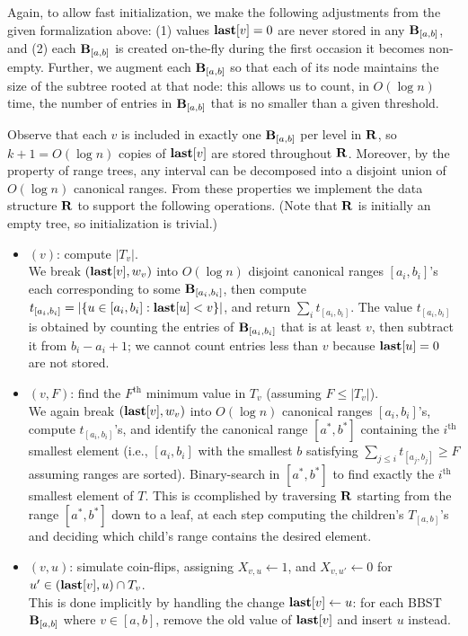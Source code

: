 Again, to allow fast initialization, we make the following adjustments from the given formalization above: (1) values $\mathbf{last}[v] = 0$ are never stored in any $\mathbf{B}_{[a,b]}$, and (2) each $\mathbf{B}_{[a,b]}$ is created on-the-fly during the first occasion it becomes non-empty. Further, we augment each $\mathbf{B}_{[a,b]}$ so that each of its node maintains the size of the subtree rooted at that node: this allows us to count, in $O(\log n)$ time, the number of entries in $\mathbf{B}_{[a,b]}$ that is no smaller than a given threshold.

Observe that each $v$ is included in exactly one $\mathbf{B}_{[a,b]}$ per level in $\mathbf{R}$, so $k+1=O(\log n)$ copies of $\mathbf{last}[v]$ are stored throughout $\mathbf{R}$. Moreover, by the property of range trees, any interval can be decomposed into a disjoint union of $O(\log n)$ canonical ranges. From these properties we implement the data structure $\mathbf{R}$ to support the following operations. (Note that $\mathbf{R}$ is initially an empty tree, so initialization is trivial.)
\begin{itemize}
\item {}$(v)$: compute $|T_v|$. \\
We break $(\mathbf{last}[v],w_v)$ into $O(\log n)$ disjoint canonical ranges $[a_i, b_i]$'s each corresponding to some $\mathbf{B}_{[a_i,b_i]}$, then compute $t_{[a_i,b_i]} =|\{u \in [a_i, b_i]: \mathbf{last}[u] < v\}|$, and return $\sum_i t_{[a_i,b_i]}$. The value $t_{[a_i, b_i]}$ is obtained by counting the entries of $\mathbf{B}_{[a_i, b_i]}$ that is at least $v$, then subtract it from $b_i-a_i+1$; we cannot count entries less than $v$ because $\mathbf{last}[u]=0$ are not stored.
\item {}$(v,F)$: find the $F^\textrm{th}$ minimum value in $T_v$ (assuming $F \leq |T_v|$). \\
We again break $(\mathbf{last}[v],w_v)$ into $O(\log n)$ canonical ranges $[a_i, b_i]$'s, compute $t_{[a_i, b_i]}$'s, and identify the canonical range $[a^*,b^*]$ containing the $i^\textrm{th}$ smallest element (i.e., $[a_i, b_i]$ with the smallest $b$ satisfying $\sum_{j \leq i} t_{[a_j,b_j]} \geq F$ assuming ranges are sorted). Binary-search in $[a^*,b^*]$ to find exactly the $i^\textrm{th}$ smallest element of $T$. This is ccomplished by traversing $\mathbf{R}$ starting from the range $[a^*,b^*]$ down to a leaf, at each step computing the children's $T_{[a,b]}$'s and deciding which child's range contains the desired element.
\item {}$(v,u)$: simulate coin-flips, assigning $X_{v,u} \leftarrow 1$, and $X_{v,u'} \leftarrow 0$ for $u' \in (\mathbf{last}[v], u) \cap T_v$. \\
This is done implicitly by handling the change $\mathbf{last}[v] \leftarrow u$: for each BBST $\mathbf{B}_{[a,b]}$ where $v \in [a, b]$, remove the old value of $\mathbf{last}[v]$ and insert $u$ instead.
\end{itemize}
